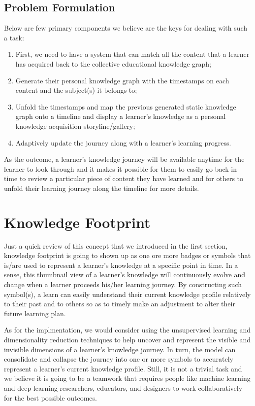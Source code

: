 \documentclass[]{book}
\theoremstyle{definition}
\theoremstyle{definition}
\theoremstyle{definition}
\theoremstyle{remark}
\begin{document}
\subsection{Problem Formulation}\label{problem-formulation-3}

Below are few primary components we believe are the keys for dealing
with such a task:

\begin{enumerate}
\def\labelenumi{\arabic{enumi}.}
\item
  First, we need to have a system that can match all the content that a
  learner has acquired back to the collective educational knowledge
  graph;
\item
  Generate their personal knowledge graph with the timestamps on each
  content and the subject(s) it belongs to;
\item
  Unfold the timestamps and map the previous generated static knowledge
  graph onto a timeline and display a learner's knowledge as a personal
  knowledge acquisition storyline/gallery;
\item
  Adaptively update the journey along with a learner's learning
  progress.
\end{enumerate}

As the outcome, a learner's knowledge journey will be available anytime
for the learner to look through and it makes it possible for them to
easily go back in time to review a particular piece of content they have
learned and for others to unfold their learning journey along the
timeline for more details.

\section{Knowledge Footprint}\label{knowledge-footprint-1}

Just a quick review of this concept that we introduced in the first
section, knowledge footprint is going to shown up as one ore more badges
or symbols that is/are used to represent a learner's knowledge at a
specific point in time. In a sense, this thumbnail view of a learner's
knowledge will continuously evolve and change when a learner proceeds
his/her learning journey. By constructing such symbol(s), a learn can
easily understand their current knowledge profile relatively to their
past and to others so as to timely make an adjustment to alter their
future learning plan.

As for the implmentation, we would consider using the unsupervised
learning and dimensionality reduction techniques to help uncover and
represent the visible and invisible dimensions of a learner's knowledge
journey. In turn, the model can consolidate and collapse the journey
into one or more symbols to accurately represent a learner's current
knowledge profile. Still, it is not a trivial task and we believe it is
going to be a teamwork that requires people like machine learning and
deep learning researchers, educators, and designers to work
collaboratively for the best possible outcomes.
\end{document}
